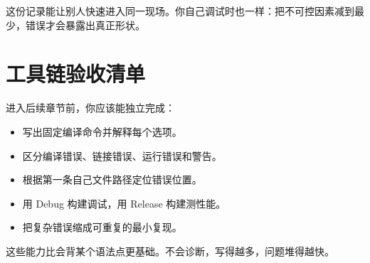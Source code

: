 这份记录能让别人快速进入同一现场。你自己调试时也一样：把不可控因素减到最少，错误才会暴露出真正形状。

\section{工具链验收清单}

进入后续章节前，你应该能独立完成：

\begin{itemize}
  \item 写出固定编译命令并解释每个选项。
  \item 区分编译错误、链接错误、运行错误和警告。
  \item 根据第一条自己文件路径定位错误位置。
  \item 用 Debug 构建调试，用 Release 构建测性能。
  \item 把复杂错误缩成可重复的最小复现。
\end{itemize}

这些能力比会背某个语法点更基础。不会诊断，写得越多，问题堆得越快。
